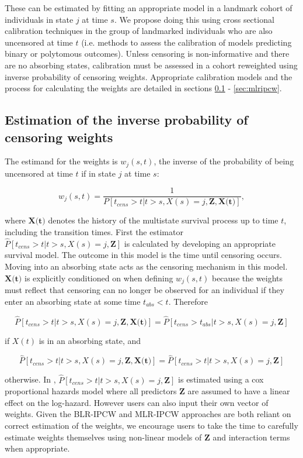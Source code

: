 \documentclass[nojss]{jss}
\begin{document}
These can be estimated by fitting an appropriate model in a landmark cohort of individuals in state $j$ at time $s$. We propose doing this using cross sectional calibration techniques in the group of landmarked individuals who are also uncensored at time $t$ (i.e. methods to assess the calibration of models predicting binary or polytomous outcomes). Unless censoring is non-informative and there are no absorbing states, calibration must be assessed in a cohort reweighted using inverse probability of censoring weights. Appropriate calibration models and the process for calculating the weights are detailed in sections \ref{sec:weights} - \ref{sec:mlripcw}.

\subsection{Estimation of the inverse probability of censoring weights} \label{sec:weights}

The estimand for the weights is $w_{j}(s,t)$, the inverse of the probability of being uncensored at time $t$ if in state $j$ at time $s$:

$$w_{j}(s,t) = \frac{1}{P[t_{cens} > t|t > s, X(s) = j, \textbf{Z},\textbf{X(t)}]},$$

where $\textbf{X(t)}$ denotes the history of the multistate survival process up to time $t$, including the transition times. First the estimator $\hat{P}[t_{cens} > t|t > s, X(s) = j, \textbf{Z}]$ is calculated by developing an appropriate survival model. The outcome in this model is the time until censoring occurs. Moving into an absorbing state acts as the censoring mechanism in this model. $\textbf{X(t)}$ is explicitly conditioned on when defining $w_{j}(s,t)$ because the weights must reflect that censoring can no longer be observed for an individual if they enter an absorbing state at some time $t_{abs} < t$. Therefore

$$\hat{P}[t_{cens} > t|t > s, X(s) = j, \textbf{Z},\textbf{X(t)}] = \hat{P}[t_{cens} > t_{abs}|t > s, X(s) = j, \textbf{Z}]$$

if $X(t)$ is in an absorbing state, and

$$\hat{P}[t_{cens} > t|t > s, X(s) = j, \textbf{Z},\textbf{X(t)}] = \hat{P}[t_{cens} > t|t > s, X(s) = j, \textbf{Z}]$$

otherwise. In , $\hat{P}[t_{cens} > t|t > s, X(s) = j, \textbf{Z}]$ is estimated using a cox proportional hazards model where all predictors $\textbf{Z}$ are assumed to have a linear effect on the log-hazard. However users can also input their own vector of weights. Given the BLR-IPCW and MLR-IPCW approaches are both reliant on correct estimation of the weights, we encourage users to take the time to carefully estimate weights themselves using non-linear models of $\textbf{Z}$ and interaction terms when appropriate.
\end{document}
